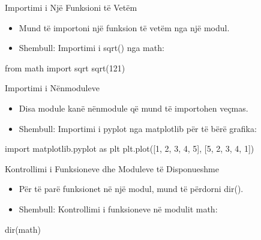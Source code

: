 \documentclass[
  ignorenonframetext,
]{beamer}
\newenvironment{Shaded}{\begin{snugshade}}{\end{snugshade}}
\newcommand{\BuiltInTok}[1]{#1}
\newcommand{\DecValTok}[1]{\textcolor[rgb]{0.00,0.00,0.81}{#1}}
\newcommand{\ImportTok}[1]{#1}
\newcommand{\NormalTok}[1]{#1}
\begin{document}
\begin{frame}[fragile]{Importimi i Një Funksioni të Vetëm}
\protect\hypertarget{importimi-i-njuxeb-funksioni-tuxeb-vetuxebm}{}
\begin{itemize}
\item
  Mund të importoni një funksion të vetëm nga një modul.
\item
  Shembull: Importimi i sqrt() nga math:
\end{itemize}

\begin{Shaded}
\begin{Highlighting}[]
\ImportTok{from}\NormalTok{ math }\ImportTok{import}\NormalTok{ sqrt}
\NormalTok{sqrt(}\DecValTok{121}\NormalTok{)}
\end{Highlighting}
\end{Shaded}
\end{frame}

\begin{frame}[fragile]{Importimi i Nënmoduleve}
\protect\hypertarget{importimi-i-nuxebnmoduleve}{}
\begin{itemize}
\item
  Disa module kanë nënmodule që mund të importohen veçmas.
\item
  Shembull: Importimi i pyplot nga matplotlib për të bërë grafika:
\end{itemize}

\begin{Shaded}
\begin{Highlighting}[]
\ImportTok{import}\NormalTok{ matplotlib.pyplot }\ImportTok{as}\NormalTok{ plt}
\NormalTok{plt.plot([}\DecValTok{1}\NormalTok{, }\DecValTok{2}\NormalTok{, }\DecValTok{3}\NormalTok{, }\DecValTok{4}\NormalTok{, }\DecValTok{5}\NormalTok{], [}\DecValTok{5}\NormalTok{, }\DecValTok{2}\NormalTok{, }\DecValTok{3}\NormalTok{, }\DecValTok{4}\NormalTok{, }\DecValTok{1}\NormalTok{])}
\end{Highlighting}
\end{Shaded}
\end{frame}

\begin{frame}[fragile]{Kontrollimi i Funksioneve dhe Moduleve të
Disponueshme}
\protect\hypertarget{kontrollimi-i-funksioneve-dhe-moduleve-tuxeb-disponueshme}{}
\begin{itemize}
\item
  Për të parë funksionet në një modul, mund të përdorni dir().
\item
  Shembull: Kontrollimi i funksioneve në modulit math:
\end{itemize}

\begin{Shaded}
\begin{Highlighting}[]
\BuiltInTok{dir}\NormalTok{(math)}
\end{Highlighting}
\end{Shaded}
\end{frame}
\end{document}
